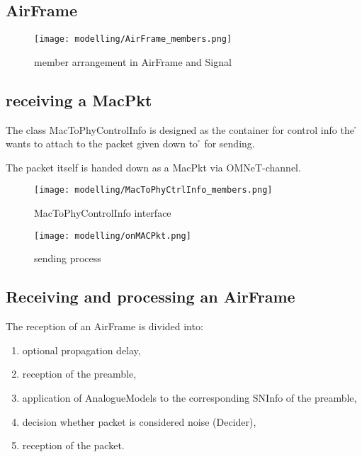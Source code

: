 \newpage

\subsection{AirFrame}


\begin{figure}[H]
 \centering
 \texttt{[image: modelling/AirFrame\_members.png]}
 \caption{member arrangement in AirFrame and Signal}
 \label{fig: member AirFrame}
\end{figure}
\newpage

\subsection{receiving a MacPkt}

The class MacToPhyControlInfo is designed as the container for control info the \h{\baseMacLayer} wants to attach to the packet given down to \h{\basePhyLayer} for sending.

The packet itself is handed down as a MacPkt via OMNeT-channel. 

\begin{figure}[h]
 \centering
 \texttt{[image: modelling/MacToPhyCtrlInfo\_members.png]}
 \caption{MacToPhyControlInfo interface}
 \label{fig: MacToPhyCtrlInfo interface}
\end{figure}

\begin{figure}[H]
 \centering
 \texttt{[image: modelling/onMACPkt.png]}
 \caption{sending process}
 \label{fig: sending process}
\end{figure}

\subsection{Receiving and processing an AirFrame}

The reception of an AirFrame is divided into:
\begin{enumerate}
	
	\item optional propagation delay,
	\item reception of the preamble,
	\item application of AnalogueModels to the corresponding SNInfo of the preamble,
	\item decision whether packet is considered noise (Decider),
	\item reception of the packet.
\end{enumerate}

